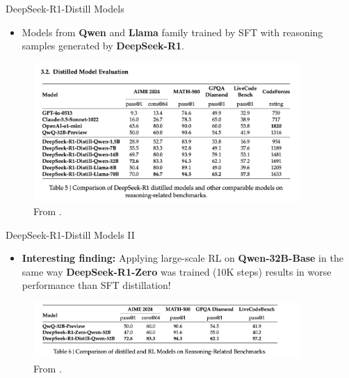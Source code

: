 \documentclass[9pt]{beamer}
\begin{document}
\begin{frame}{DeepSeek-R1-Distill Models}

\begin{itemize}
    \item Models from \textbf{Qwen} and \textbf{Llama} family trained by SFT with reasoning samples generated by \textbf{DeepSeek-R1}.
\end{itemize}

  \begin{figure}
    \centering
    \includegraphics[width=0.9\textwidth]{figures/distill-eval-1.png}
    \caption{From \cite{deepseekai2025deepseekr1incentivizingreasoningcapability}.}
    \label{fig:trl11}
  \end{figure}
  
\end{frame}

\begin{frame}{DeepSeek-R1-Distill Models II}

\begin{itemize}
    \item \textbf{Interesting finding:} Applying large-scale RL on \textbf{Qwen-32B-Base} in the same way \textbf{DeepSeek-R1-Zero} was trained (10K steps) results in worse performance than SFT distillation!
\end{itemize}
  \begin{figure}
    \centering
    \includegraphics[width=0.9\textwidth]{figures/distill-eval-2.png}
    \caption{From \cite{deepseekai2025deepseekr1incentivizingreasoningcapability}.}
    \label{fig:trl12}
  \end{figure}
  
\end{frame}
\end{document}

